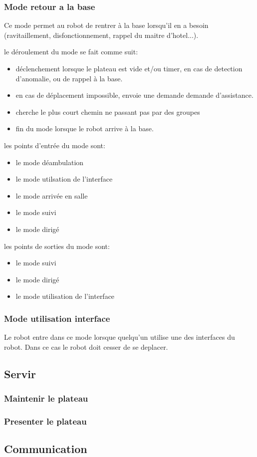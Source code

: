 \subsubsection{Mode retour a la base}

Ce mode permet au robot de rentrer à la base lorsqu'il en a besoin
(ravitaillement, disfonctionnement, rappel du maitre d'hotel...).

le déroulement du mode se fait comme suit:
\begin{itemize}
\item déclenchement lorsque le plateau est vide et/ou timer, en cas de
  detection d'anomalie, ou de rappel à la base.
\item en cas de déplacement impossible, envoie une demande demande
  d'assistance.
\item cherche le plus court chemin ne passant pas par des groupes
\item fin du mode lorsque le robot arrive à la base.\\
\end{itemize}

les points d'entrée du mode sont:
\begin{itemize}
\item le mode déambulation
\item le mode utilsation de l'interface
\item le mode arrivée en salle
\item le mode suivi
\item le mode dirigé\\
\end{itemize}

les points de sorties du mode sont:
\begin{itemize}
\item le mode suivi
\item le mode dirigé
\item le mode utilisation de l'interface\\
\end{itemize}

\subsubsection{Mode utilisation interface}
Le robot entre dans ce mode lorsque quelqu'un utilise une des
interfaces du robot. Dans ce cas le robot doit cesser de se deplacer.

\subsection{Servir}

\subsubsection{Maintenir le plateau}

\subsubsection{Presenter le plateau}

\subsection{Communication}
 

